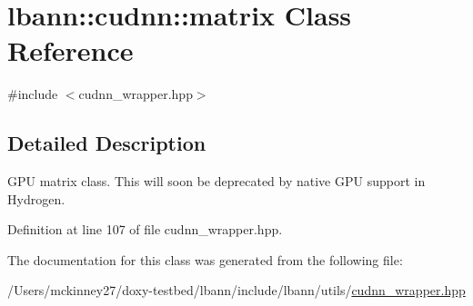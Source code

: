 \hypertarget{classlbann_1_1cudnn_1_1matrix}{}\section{lbann\+:\+:cudnn\+:\+:matrix Class Reference}
\label{classlbann_1_1cudnn_1_1matrix}


{\ttfamily \#include $<$cudnn\+\_\+wrapper.\+hpp$>$}



\subsection{Detailed Description}
G\+PU matrix class. This will soon be deprecated by native G\+PU support in Hydrogen. 

Definition at line 107 of file cudnn\+\_\+wrapper.\+hpp.



The documentation for this class was generated from the following file\+:\begin{DoxyCompactItemize}
\item 
/\+Users/mckinney27/doxy-\/testbed/lbann/include/lbann/utils/\hyperlink{cudnn__wrapper_8hpp}{cudnn\+\_\+wrapper.\+hpp}\end{DoxyCompactItemize}
